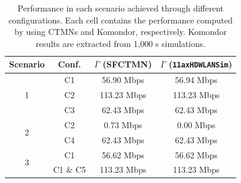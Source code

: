 \documentclass[preprint,12pt]{elsarticle}
\begin{document}
\begin{table}[t!]
	\centering
	\begin{tabular}{|c|c|c|c|}
		\hline
		\textbf{Scenario} & \textbf{Conf.} & \textbf{$\overline{\Gamma}$ (SFCTMN)} & \textbf{$\overline{\Gamma}$ (\texttt{11axHDWLANSim})} \\ \hline
		\multirow{3}{*}{1} & C1 & 56.90 Mbps &  56.94 Mbps\\ \cline{2-4} 
		& C2 & 113.23 Mbps & 113.23 Mbps\\ \cline{2-4} 
		& C3 & 62.43 Mbps & 62.43 Mbps\\ \hline
		\multirow{2}{*}{2} & C2 & 0.73 Mbps & 0.00 Mbps\\ \cline{2-4} 
		& C4 & 62.43 Mbps & 62.43 Mbps \\ \hline
		\multirow{2}{*}{3} & C1 & 56.62 Mbps & 56.62 Mbps\\ \cline{2-4} 
		& C1 \& C5 & 113.23 Mbps & 113.23 Mbps \\ \hline
	\end{tabular}
	\caption{Performance in each scenario achieved through different configurations. Each cell contains the performance computed by using CTMNs and Komondor, respectively. Komondor results are extracted from 1,000 s simulations.}
	\label{tbl:results_sr_improvements}
\end{table}
\end{document}
